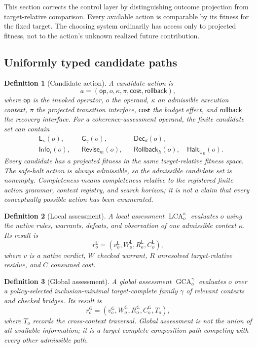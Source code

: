 \documentclass[10pt]{article}
\newtheorem{definition}{Definition}[section]
\newcommand{\GCA}{\operatorname{GCA}}
\newcommand{\LCA}{\operatorname{LCA}}
\newcommand{\Loc}{\mathsf L}
\newcommand{\Glob}{\mathsf G}
\newcommand{\UB}{\mathsf{U}_B}
\begin{document}
This section corrects the control layer by distinguishing outcome projection from target-relative comparison.  Every available action is comparable by its fitness for the fixed target.  The choosing system ordinarily has access only to projected fitness, not to the action's unknown realized future contribution.

\subsection{Uniformly typed candidate paths}

\begin{definition}[Candidate action]
A candidate action is
\[
  a=(\mathsf{op},o,\kappa,\pi,\mathsf{cost},\mathsf{rollback}),
\]
where $\mathsf{op}$ is the invoked operator, $o$ the operand, $\kappa$ an admissible execution context, $\pi$ the projected transition interface, $\mathsf{cost}$ the budget effect, and $\mathsf{rollback}$ the recovery interface.  For a coherence-assessment operand, the finite candidate set can contain
\[
\begin{aligned}
  &\Loc_\kappa(o), &&\Glob_\gamma(o), &&\mathsf{Dec}_d(o),\\
  &\mathsf{Info}_i(o), &&\mathsf{Revise}_m(o),
  &&\mathsf{Rollback}_h(o),\quad\mathsf{Halt}_{\UB}(o).
\end{aligned}
\]
Every candidate has a projected fitness in the same target-relative fitness space.  The safe-halt action is always admissible, so the admissible candidate set is nonempty.  Completeness means completeness relative to the registered finite action grammar, context registry, and search horizon; it is not a claim that every conceptually possible action has been enumerated.
\end{definition}

\begin{definition}[Local assessment]
A local assessment $\LCA_o^\kappa$ evaluates $o$ using the native rules, warrants, defeats, and observation of one admissible context $\kappa$.  Its result is
\[
  r_o^{\Loc}=(v_o^{\Loc},W_o^{\Loc},R_o^{\Loc},C_o^{\Loc}),
\]
where $v$ is a native verdict, $W$ checked warrant, $R$ unresolved target-relative residue, and $C$ consumed cost.
\end{definition}

\begin{definition}[Global assessment]
A global assessment $\GCA_o^\gamma$ evaluates $o$ over a policy-selected inclusion-minimal target-complete family $\gamma$ of relevant contexts and checked bridges.  Its result is
\[
  r_o^{\Glob}=(v_o^{\Glob},W_o^{\Glob},R_o^{\Glob},C_o^{\Glob},T_o),
\]
where $T_o$ records the cross-context traversal.  Global assessment is not the union of all available information; it is a target-complete composition path competing with every other admissible path.
\end{definition}
\end{document}
